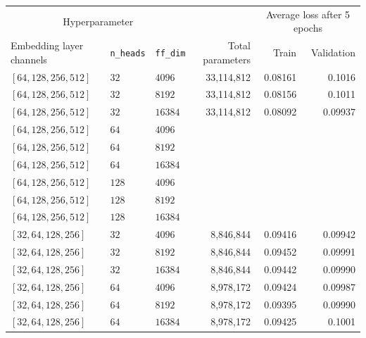 \begin{table}[H]
  \centering
  \begin{adjustbox}{width=\textwidth}
    \begin{tabular}{lll|rrr}

      \multicolumn{3}{c}{Hyperparameter} && \multicolumn{2}{c}{Average loss
      after 5 epochs} \\

      Embedding layer channels & \texttt{n\_heads} & \texttt{ff\_dim} & Total
      parameters & Train & Validation\\

      \hline

      $[64, 128, 256, 512 ]$& $32$ & $4096$ & 33,114,812 & 0.08161 & 0.1016   \\
      $[64, 128, 256, 512 ]$& $32$ & $8192$ & 33,114,812 & 0.08156 & 0.1011 \\
      $[64, 128, 256, 512 ]$& $32$ & $16384$ & 33,114,812 & 0.08092 & 0.09937 \\[0.1cm]

      $[64, 128, 256, 512 ]$& $64$ & $4096$ & && \\
      $[64, 128, 256, 512 ]$& $64$ & $8192$ & && \\
      $[64, 128, 256, 512 ]$& $64$ & $16384$ & && \\[0.1cm]
      
      $[64, 128, 256, 512 ]$& $128$ & $4096$ & && \\
      $[64, 128, 256, 512 ]$& $128$ & $8192$ & && \\
      $[64, 128, 256, 512 ]$& $128$ & $16384$ & && \\[0.5cm]

      

      $[32, 64, 128, 256 ]$& $32$ & $4096$ & 8,846,844 & 0.09416 & 0.09942 \\
      $[32, 64, 128, 256 ]$& $32$ & $8192$ & 8,846,844 & 0.09452 & 0.09991 \\
      $[32, 64, 128, 256 ]$& $32$ & $16384$ & 8,846,844 & 0.09442 & 0.09990 \\[0.1cm]
      
      $[32, 64, 128, 256 ]$& $64$ & $4096$ & 8,978,172 & 0.09424 & 0.09987 \\
      $[32, 64, 128, 256 ]$& $64$ & $8192$ & 8,978,172 & 0.09395 & 0.09990 \\
      $[32, 64, 128, 256 ]$& $64$ & $16384$ & 8,978,172 & 0.09425 & 0.1001 \\[0.1cm]
      

\end{tabular}
\end{adjustbox}
\end{table}
